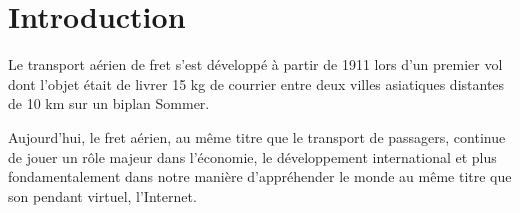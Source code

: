 
\pagebreak

\section{Introduction}

Le transport aérien de fret s'est développé à partir de 1911 lors d'un
premier vol dont l'objet était de livrer 15 kg de courrier entre deux villes asiatiques distantes de 10 km sur un biplan Sommer. 


Aujourd'hui, le fret aérien, au même titre que le transport de passagers, continue de jouer un rôle majeur dans l'économie, le développement international et plus fondamentalement dans notre manière d'appréhender le monde au même titre que son pendant virtuel, l'Internet. 


%
%
%
%   



